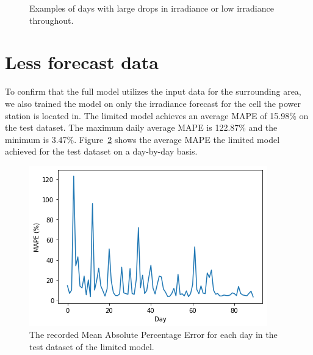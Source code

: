 \begin{figure}[ht!]
    \caption{Examples of days with large drops in irradiance or low irradiance throughout.
    \label{fig:full_high}}
\end{figure}




\clearpage
\section{Less forecast data}
To confirm that the full model utilizes the input data for the surrounding area, we also trained the model on only the irradiance forecast for the cell the power station is located in.
The limited model achieves an average MAPE of 15.98\% on the test dataset. The maximum daily average MAPE is 122.87\% and the minimum is 3.47\%. Figure~\ref{fig:days_less} shows the average MAPE the limited model achieved for the test dataset on a day-by-day basis.
\begin{figure}[ht!]
    \centering
    \includegraphics[scale=0.8]{imgs/graphs/less/days_single.png}
    \caption{The recorded Mean Absolute Percentage Error for each day in the test dataset of the limited model. 
    \label{fig:days_less}}
\end{figure}


